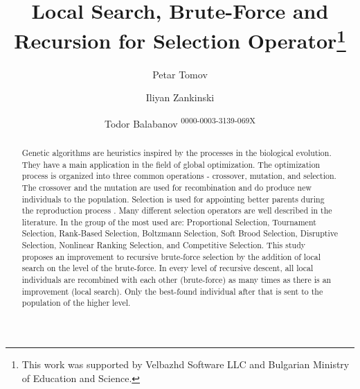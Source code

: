 \documentclass{svproc}
\begin{document}
\mainmatter 

\title{Local Search, Brute-Force and Recursion for Selection Operator\thanks{This work was supported by Velbazhd Software LLC and Bulgarian Ministry of Education and Science.}}

\author{Petar Tomov \and Iliyan Zankinski \and Todor Balabanov \textsuperscript{\tiny{0000-0003-3139-069X}}}
%
%
\maketitle

\begin{abstract}
Genetic algorithms are heuristics inspired by the processes in the biological evolution. They have a main application in the field of global optimization. The optimization process is organized into three common operations - crossover, mutation, and selection. The crossover and the mutation are used for recombination and do produce new individuals to the population. Selection is used for appointing better parents during the reproduction process \cite{matsui-01}. Many different selection operators are well described in the literature. In the group of the most used are: Proportional Selection, Tournament Selection, Rank-Based Selection, Boltzmann Selection, Soft Brood Selection, Disruptive Selection, Nonlinear Ranking Selection, and Competitive Selection. This study proposes an improvement to recursive brute-force selection by the addition of local search on the level of the brute-force. In every level of recursive descent, all local individuals are recombined with each other (brute-force) as many times as there is an improvement (local search). Only the best-found individual after that is sent to the population of the higher level.
\end{abstract}
\end{document}
